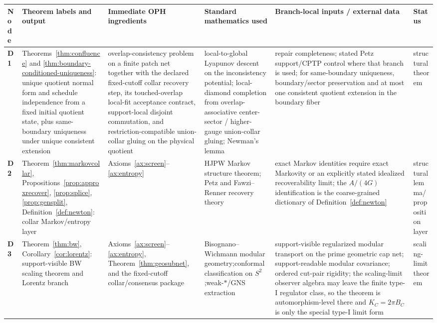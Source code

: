 \documentclass[11pt]{article}
\begin{document}
\begingroup
\scriptsize
\setlength{\tabcolsep}{1pt}
\begin{longtable}{@{}>{\raggedright\arraybackslash}p{}>{\raggedright\arraybackslash}p{}>{\raggedright\arraybackslash}p{}>{\raggedright\arraybackslash}p{}>{\raggedright\arraybackslash}p{}>{\raggedright\arraybackslash}p{}@{}}
\toprule
Node & Theorem labels and output & Immediate OPH ingredients & Standard mathematics used & Branch-local inputs / external data & Status \\
\midrule
\endhead
\bottomrule
\endfoot
\textbf{D1} & Theorems~\ref{thm:confluence} and \ref{thm:boundary-conditioned-uniqueness}: unique quotient normal form and schedule independence from a fixed initial quotient state, plus same-boundary uniqueness under unique consistent extension & overlap-consistency problem on a finite patch net together with the declared fixed-cutoff collar recovery step, its touched-overlap local-fit acceptance contract, support-local disjoint commutation, and restriction-compatible union-collar gluing on the physical quotient & local-to-global Lyapunov descent on the inconsistency potential; local-diamond completion from overlap-associative center-sector / higher-gauge union-collar gluing; Newman's lemma & repair completeness; stated Petz support/CPTP control where that branch is used; for same-boundary uniqueness, boundary/sector preservation and at most one consistent quotient extension in the boundary fiber & structural theorem \\
\textbf{D2} & Theorem~\ref{thm:markovcollar}, Propositions~\ref{prop:approxrecover}, \ref{prop:splice}, \ref{prop:gensplit}, Definition~\ref{def:newton}: collar Markov/entropy layer & Axioms~\ref{ax:screen}--\ref{ax:entropy} & HJPW Markov structure theorem; Petz and Fawzi--Renner recovery theory & exact Markov identities require exact Markovity or an explicitly stated idealized recoverability limit; the \(A/(4G)\) identification is the coarse-grained dictionary of Definition~\ref{def:newton} & structural lemma/\newline proposition layer \\
\textbf{D3} & Theorem~\ref{thm:bw}, Corollary~\ref{cor:lorentz}: support-visible BW scaling theorem and Lorentz branch & Axioms~\ref{ax:screen}--\ref{ax:entropy}, Theorem~\ref{thm:geosubnet}, and the fixed-cutoff collar/consensus package & Bisognano--Wichmann modular geometry;\newline conformal classification on \(S^2\);\newline weak-\(*\)/GNS extraction & support-visible regularized modular transport on the prime geometric cap net; support-readable modular covariance; ordered cut-pair rigidity; the scaling-limit observer algebra may leave the finite type-I regulator class, so the theorem is automorphism-level there and \(K_C=2\pi B_C\) is only the special type-I limit form & scaling-limit\newline theorem \\

\end{longtable}
\end{document}
